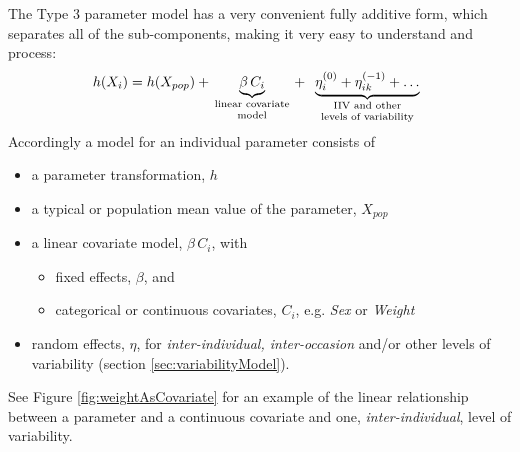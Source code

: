 The Type 3 parameter model has a very convenient fully additive form, which separates all of the sub-components, making it very easy to understand and process:
\begin{align*}
h(X_i) = h(X_{pop})
+ \underbrace{\beta \,C_i}_{\text{\parbox{2cm}{\centering linear covariate\\[-4pt] model}}}
+ \underbrace{\eta_i^{(0)}+ \eta_{ik}^{(-1)} + \dots}_{\text{\parbox{3cm}{\centering IIV and other\\[-4pt] levels of variability}}}
\end{align*}
Accordingly a model for an individual parameter consists of
\begin{itemize}
\item
a parameter transformation, $h$
\item
a typical or population mean value of the parameter, $X_{pop}$
\item
a linear covariate model, $\beta \, C_i$, with
\begin{itemize}
\item
fixed effects, $\beta$, and
\item
categorical or continuous covariates, $C_i$, e.g. \textit{Sex} or \textit{Weight}
\end{itemize}
\item
random effects, $\eta$, for \textit{inter-individual, inter-occasion} and/or other levels of variability (section \ref{sec:variabilityModel}).
\end{itemize}
See Figure \ref{fig:weightAsCovariate} for an example of the linear relationship between a parameter and a continuous covariate and one, \textit{inter-individual}, level of variability.

